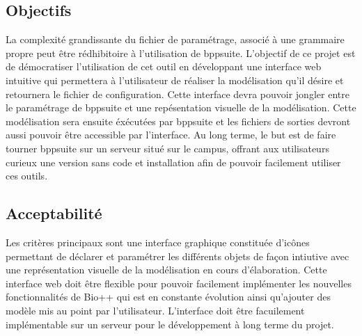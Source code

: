 	
\subsection{Objectifs}
	La complexité grandissante du fichier de paramétrage, associé à une grammaire propre peut être rédhibitoire à l'utilisation de bppsuite. L'objectif de ce projet est de démocratiser l'utilisation de cet outil en développant une interface web intuitive qui permettera à l'utilisateur de réaliser la modélisation qu'il désire et retournera le fichier de configuration. Cette interface devra pouvoir jongler entre le paramétrage de bppsuite et une repésentation visuelle de la modélisation. Cette modélisation sera ensuite éxécutées par bppsuite et les fichiers de sorties devront aussi pouvoir être accessible par l'interface. Au long terme, le but est de faire tourner bppsuite sur un serveur situé sur le campus, offrant aux utilisateurs curieux une version sans code et installation afin de pouvoir facilement utiliser ces outils.
	
\subsection{Acceptabilité}
	Les critères principaux sont une interface graphique constituée d'icônes permettant de déclarer et paramétrer les différents objets de façon intiutive avec une représentation visuelle de la modélisation en cours d'élaboration. Cette interface web doit être flexible pour pouvoir facilement implémenter les nouvelles fonctionnalités de Bio++ qui est en constante évolution ainsi qu'ajouter des modèle mis au point par l'utilisateur. L'interface doit être facuilement implémentable sur un serveur pour le développement à long terme du projet.
	
	
